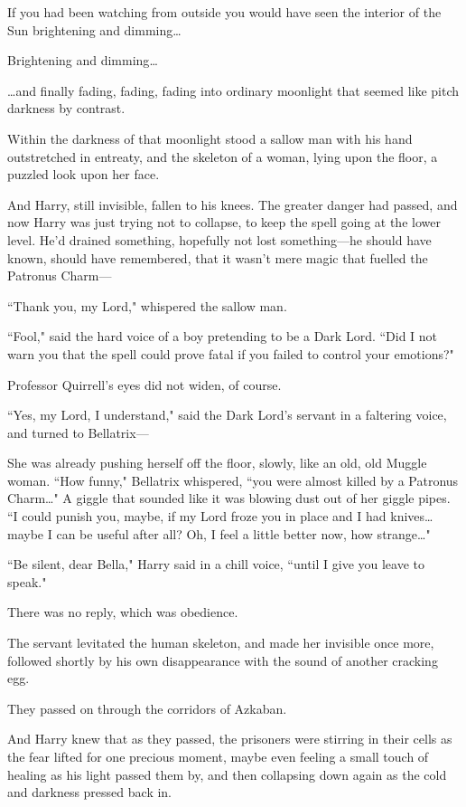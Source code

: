 If you had been watching from outside you would have seen the interior of the Sun brightening and dimming{\ldots}

Brightening and dimming{\ldots}

{\ldots}and finally fading, fading, fading into ordinary moonlight that seemed like pitch darkness by contrast.

Within the darkness of that moonlight stood a sallow man with his hand outstretched in entreaty, and the skeleton of a woman, lying upon the floor, a puzzled look upon her face.

And Harry, still invisible, fallen to his knees. The greater danger had passed, and now Harry was just trying not to collapse, to keep the spell going at the lower level. He'd drained something, hopefully not lost something---he should have known, should have remembered, that it wasn't mere magic that fuelled the Patronus Charm---

``Thank you, my Lord," whispered the sallow man.

``Fool," said the hard voice of a boy pretending to be a Dark Lord. ``Did I not warn you that the spell could prove fatal if you failed to control your emotions?"

Professor Quirrell's eyes did not widen, of course.

``Yes, my Lord, I understand," said the Dark Lord's servant in a faltering voice, and turned to Bellatrix---

She was already pushing herself off the floor, slowly, like an old, old Muggle woman. ``How funny," Bellatrix whispered, ``you were almost killed by a Patronus Charm{\ldots}" A giggle that sounded like it was blowing dust out of her giggle pipes. ``I could punish you, maybe, if my Lord froze you in place and I had knives{\ldots} maybe I can be useful after all? Oh, I feel a little better now, how strange{\ldots}"

``Be silent, dear Bella," Harry said in a chill voice, ``until I give you leave to speak."

There was no reply, which was obedience.

The servant levitated the human skeleton, and made her invisible once more, followed shortly by his own disappearance with the sound of another cracking egg.

They passed on through the corridors of Azkaban.

And Harry knew that as they passed, the prisoners were stirring in their cells as the fear lifted for one precious moment, maybe even feeling a small touch of healing as his light passed them by, and then collapsing down again as the cold and darkness pressed back in.

